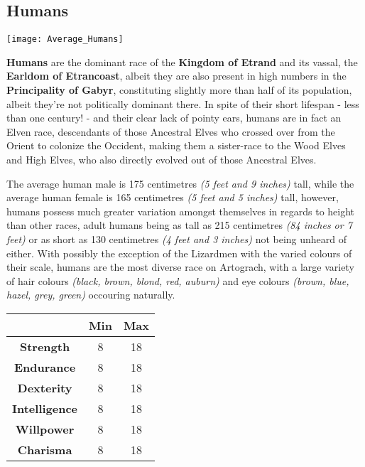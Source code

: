 \subsection{Humans}

\texttt{[image: Average\_Humans]}

\textbf{Humans} are the dominant race of the \textbf{Kingdom of Etrand} and its vassal, the \textbf{Earldom of Etrancoast}, albeit they are also present in high numbers in the \textbf{Principality of Gabyr}, constituting slightly more than half of its population, albeit they're not politically dominant there. In spite of their short lifespan - less than one century! - and their clear lack of pointy ears, humans are in fact an Elven race, descendants of those Ancestral Elves who crossed over from the Orient to colonize the Occident, making them a sister-race to the Wood Elves and High Elves, who also directly evolved out of those Ancestral Elves.

The average human male is 175 centimetres \textit{(5 feet and 9 inches)} tall, while the average human female is 165 centimetres \textit{(5 feet and 5 inches)} tall, however, humans possess much greater variation amongst themselves in regards to height than other races, adult humans being as tall as 215 centimetres \textit{(84 inches or 7 feet)} or as short as 130 centimetres \textit{(4 feet and 3 inches)} not being unheard of either. With possibly the exception of the Lizardmen with the varied colours of their scale, humans are the most diverse race on Artograch, with a large variety of hair colours \textit{(black, brown, blond, red, auburn)} and eye colours \textit{(brown, blue, hazel, grey, green)} occouring naturally.


\begin{tabular}{|c|c|c|}
\hline
 & \textbf{Min} & \textbf{Max} \\ \hline
\textbf{Strength} & 8 & 18 \\ \hline
\textbf{Endurance} & 8 & 18 \\ \hline
\textbf{Dexterity} & 8 & 18 \\ \hline
\textbf{Intelligence} & 8 & 18 \\ \hline
\textbf{Willpower} & 8 & 18 \\ \hline
\textbf{Charisma} & 8 & 18 \\ \hline
\end{tabular}


 \newpage
